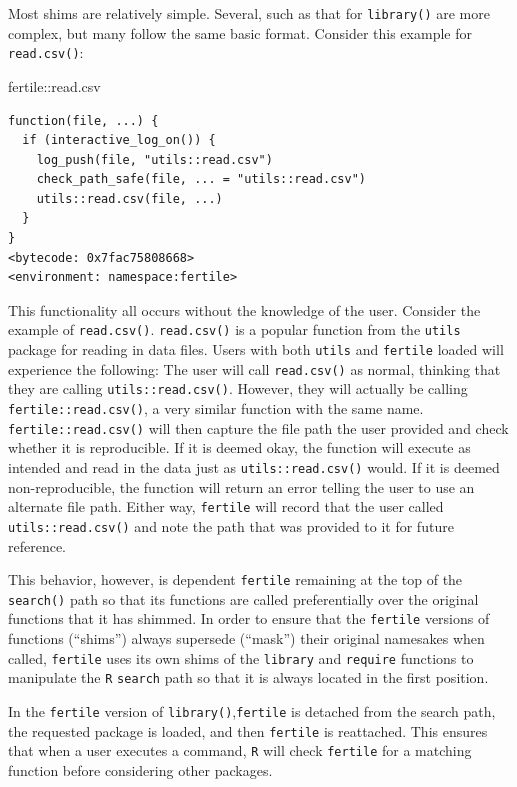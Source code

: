 \documentclass[12pt,twoside]{reedthesis}
\newenvironment{Shaded}{\begin{snugshade}}{\end{snugshade}}
\newcommand{\NormalTok}[1]{#1}
\newcommand{\SpecialCharTok}[1]{\textcolor[rgb]{0.00,0.00,0.00}{#1}}
\begin{document}
Most shims are relatively simple. Several, such as that for \texttt{library()} are more complex, but many follow the same basic format. Consider this example for \texttt{read.csv()}:
\begin{Shaded}
\begin{Highlighting}[]
\NormalTok{fertile}\SpecialCharTok{::}\NormalTok{read.csv}
\end{Highlighting}
\end{Shaded}
\begin{verbatim}
function(file, ...) {
  if (interactive_log_on()) {
    log_push(file, "utils::read.csv")
    check_path_safe(file, ... = "utils::read.csv")
    utils::read.csv(file, ...)
  }
}
<bytecode: 0x7fac75808668>
<environment: namespace:fertile>
\end{verbatim}
This functionality all occurs without the knowledge of the user. Consider the example of \texttt{read.csv()}. \texttt{read.csv()} is a popular function from the \texttt{utils} package for reading in data files. Users with both \texttt{utils} and \texttt{fertile} loaded will experience the following: The user will call \texttt{read.csv()} as normal, thinking that they are calling \texttt{utils::read.csv()}. However, they will actually be calling \texttt{fertile::read.csv()}, a very similar function with the same name. \texttt{fertile::read.csv()} will then capture the file path the user provided and check whether it is reproducible. If it is deemed okay, the function will execute as intended and read in the data just as \texttt{utils::read.csv()} would. If it is deemed non-reproducible, the function will return an error telling the user to use an alternate file path. Either way, \texttt{fertile} will record that the user called \texttt{utils::read.csv()} and note the path that was provided to it for future reference.

This behavior, however, is dependent \texttt{fertile} remaining at the top of the \texttt{search()} path so that its functions are called preferentially over the original functions that it has shimmed. In order to ensure that the \texttt{fertile} versions of functions (``shims'') always supersede (``mask'') their original namesakes when called, \texttt{fertile} uses its own shims of the \texttt{library} and \texttt{require} functions to manipulate the \texttt{R} \texttt{search} path so that it is always located in the first position.

In the \texttt{fertile} version of \texttt{library()},\texttt{fertile} is detached from the search path, the requested package is loaded, and then \texttt{fertile} is reattached. This ensures that when a user executes a command, \texttt{R} will check \texttt{fertile} for a matching function before considering other packages.
\end{document}

